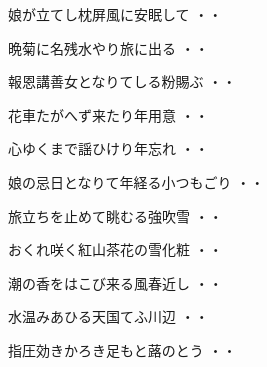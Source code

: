 \begin{shiika}娘が立てし枕屏風に安眠して
\hfill{・・}\end{shiika}
\vspace{0.6cm}
\begin{shiika}晩菊に名残水やり旅に出る
\hfill{・・}\end{shiika}
\vspace{0.6cm}
\begin{shiika}報恩講善女となりてしる粉賜ぶ
\hfill{・・}\end{shiika}
\vspace{0.6cm}
\begin{shiika}花車たがへず来たり年用意
\hfill{・・}\end{shiika}
\vspace{0.6cm}
\begin{shiika}心ゆくまで謡ひけり年忘れ
\hfill{・・}\end{shiika}
\vspace{0.6cm}
\begin{shiika}娘の忌日となりて年経る小つもごり
\hfill{・・}\end{shiika}
\vspace{0.6cm}
\begin{shiika}旅立ちを止めて眺むる強吹雪
\hfill{・・}\end{shiika}
\vspace{0.6cm}
\begin{shiika}おくれ咲く紅山茶花の雪化粧
\hfill{・・}\end{shiika}
\vspace{0.6cm}
\begin{shiika}潮の香をはこび来る風春近し
\hfill{・・}\end{shiika}
\vspace{0.6cm}
\begin{shiika}水温みあひる天国てふ川辺
\hfill{・・}\end{shiika}
\vspace{0.6cm}
\begin{shiika}指圧効きかろき足もと蕗のとう
\hfill{・・}\end{shiika}
\vspace{0.6cm}
